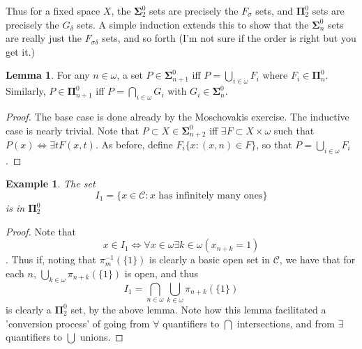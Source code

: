 \documentclass{article}
\theoremstyle{definition}
\newtheorem{lemma}{Lemma}[section]
\theoremstyle{plain}
\newtheorem{example}{Example}
\begin{document}
Thus for a fixed space $X$, the $\bm{\Sigma}^0_2$ sets are precisely the $F_{\sigma}$ sets, and $\bm{\Pi}^0_2$ sets are precisely the $G_{\delta}$ sets. A simple induction extends this to show that the $\bm{\Sigma}^0_n$ sets are really just the $F_{\sigma \delta}$ sets, and so forth (I'm not sure if the order is right but you get it.)
\begin{lemma}
	For any $n \in \omega$, a set $P \in \bm{\Sigma}^0_{n+1}$ iff $P = \bigcup_{i \in \omega}F_i$ where $F_i \in \bm{\Pi}^0_n$. Similarly, $P \in \bm{\Pi}^0_{n+1}$ iff $P = \bigcap_{i \in \omega}G_i$ with $G_i \in \bm{\Sigma}^0_n$. 
\end{lemma}
\begin{proof}
	The base case is done already by the Moschovakis exercise. The inductive case is nearly trivial. Note that $P \subset X \in \bm{\Sigma}^0_{n+2}$ iff $\exists F \subset X \times \omega$ such that $P(x) \iff \exists t F(x,t)$. As before, define $F_i \{x: (x,n) \in F\}$, so that $P = \bigcup_{i \in \omega} F_i$. 
\end{proof}
\begin{example}
    The set \[ I_1 = \{x \in \mathcal{C}: \textrm{$x$ has infinitely many ones}\} \] is in $\bm{\Pi}_2^0$
\end{example}
\begin{proof}
    Note that \[x \in I_1 \iff \forall x \in \omega \exists k \in \omega (x_{n+k} = 1)\]. Thus if, noting that $\pi_m^{-1}(\{1\})$ is clearly a basic open set in $\mathcal{C}$, we have that for each $n$, $\bigcup_{k \in \omega} \pi_{n+k}(\{1\})$ is open, and thus \[ I_1 = \bigcap_{n \in \omega} \bigcup_{k \in \omega} \pi_{n+k}(\{1\})\] is clearly a $\bm{\Pi}_2^0$ set, by the above lemma. Note how this lemma facilitated a 'conversion process' of going from $\forall$ quantifiers to $\bigcap$ intersections, and from $\exists$ quantifiers to $\bigcup$ unions.
\end{proof}
\end{document}
